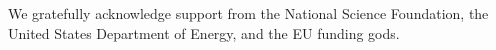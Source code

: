 \begin{acknowledgments}
We gratefully acknowledge support from the National Science Foundation, the United States Department of Energy, and the EU funding gods.
\end{acknowledgments}